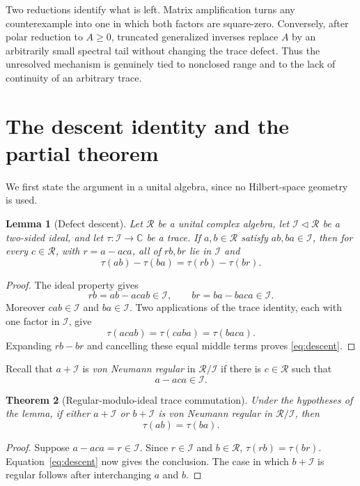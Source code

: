 \documentclass[11pt]{article}
\newtheorem{theorem}{Theorem}
\newtheorem{lemma}[theorem]{Lemma}
\theoremstyle{remark}
\newcommand{\trc}{\tau}
\begin{document}
Two reductions identify what is left.  Matrix amplification turns any
counterexample into one in which both factors are square-zero.  Conversely,
after polar reduction to $A\geq0$, truncated generalized inverses replace $A$
by an arbitrarily small spectral tail without changing the trace defect.
Thus the unresolved mechanism is genuinely tied to nonclosed range and to the
lack of continuity of an arbitrary trace.

\section{The descent identity and the partial theorem}

We first state the argument in a unital algebra, since no Hilbert-space
geometry is used.

\begin{lemma}[Defect descent]
Let $\mathcal R$ be a unital complex algebra, let $\mathcal I\lhd\mathcal R$
be a two-sided ideal, and let $\trc:\mathcal I\to\mathbb C$ be a trace.  If
$a,b\in\mathcal R$ satisfy $ab,ba\in\mathcal I$, then for every
$c\in\mathcal R$, with $r=a-aca$, all of $rb,br$ lie in $\mathcal I$ and
\begin{equation}\label{eq:descent}
  \trc(ab)-\trc(ba)=\trc(rb)-\trc(br).
\end{equation}
\end{lemma}

\begin{proof}
The ideal property gives
\[
 rb=ab-acab\in\mathcal I,
 \qquad
 br=ba-baca\in\mathcal I.
\]
Moreover $cab\in\mathcal I$ and $ba\in\mathcal I$.  Two applications of the
trace identity, each with one factor in $\mathcal I$, give
\[
 \trc(acab)=\trc(caba)=\trc(baca).
\]
Expanding $rb-br$ and cancelling these equal middle terms proves
\eqref{eq:descent}.
\end{proof}

Recall that $a+\mathcal I$ is \emph{von Neumann regular} in
$\mathcal R/\mathcal I$ if there is $c\in\mathcal R$ such that
\[
 a-aca\in\mathcal I.
\]

\begin{theorem}[Regular-modulo-ideal trace commutation]\label{thm:regular}
Under the hypotheses of the lemma, if either $a+\mathcal I$ or
$b+\mathcal I$ is von Neumann regular in $\mathcal R/\mathcal I$, then
\[
 \trc(ab)=\trc(ba).
\]
\end{theorem}

\begin{proof}
Suppose $a-aca=r\in\mathcal I$.  Since $r\in\mathcal I$ and $b\in\mathcal R$,
$\trc(rb)=\trc(br)$.  Equation~\eqref{eq:descent} now gives the conclusion.
The case in which $b+\mathcal I$ is regular follows after interchanging
$a$ and $b$.
\end{proof}
\end{document}
